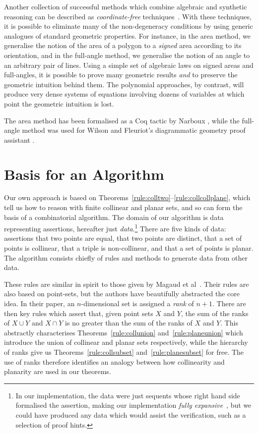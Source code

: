 Another collection of successful methods which combine algebraic and synthetic reasoning can be described as \emph{coordinate-free} techniques~\cite{MachineProofsInGeometry}. With these techniques, it is possible to eliminate many of the non-degeneracy conditions by using generic analogues of standard geometric properties. For instance, in the area method, we generalise the notion of the area of a polygon to a \emph{signed} area according to its orientation, and in the full-angle method, we generalise the notion of an angle to an arbitrary pair of lines. Using a simple set of algebraic laws on signed areas and full-angles, it is possible to prove many geometric results \emph{and} to preserve the geometric intuition behind them. The polynomial approaches, by contrast, will produce very dense systems of equations involving dozens of variables at which point the geometric intuition is lost. 

The area method has been formalised as a Coq tactic by Narboux \cite{NarbouxAreaMethod}, while the full-angle method was used for Wilson and Fleuriot's diagrammatic geometry proof assistant \cite{GeometryExplorer}.

\section{Basis for an Algorithm}
Our own approach is based on Theorems~\ref{rule:colltwo}--\ref{rule:collcollplane}, which tell us how to reason with finite collinear and planar sets, and so can form the basis of a combinatorial algorithm. The domain of our algorithm is data representing assertions, hereafter just \emph{data}.\footnote{In our implementation, the data were just sequents  whose right hand side formalised the assertion, making our implementation \emph{fully expansive}~\cite{FullyExpansive}, but we could have produced any data which would assist the verification, such as a selection of proof hints.} There are five kinds of data: assertions that two points are equal, that two points are distinct, that a set of points is collinear, that a triple is non-collinear, and that a set of points is planar. The algorithm consists chiefly of rules and methods to generate data from other data.

These rules are similar in spirit to those given by Magaud et al~\cite{RankDesargues}. Their rules are also based on point-sets, but the authors have beautifully abstracted the core idea. In their paper, an $n$-dimensional set is assigned a \emph{rank} of $n+1$. There are then key rules which assert that, given point sets $X$ and $Y$, the sum of the ranks of $X \cup Y$ and $X \cap Y$ is no greater than the sum of the ranks of $X$ and $Y$. This abstractly characterises Theorems~\ref{rule:collunion} and~\ref{rule:planeunion} which introduce the union of collinear and planar sets respectively, while the hierarchy of ranks give us Theorems~\ref{rule:collsubset} and~\ref{rule:planesubset} for free. The use of ranks therefore identifies an analogy between how collinearity and planarity are used in our theorems.

